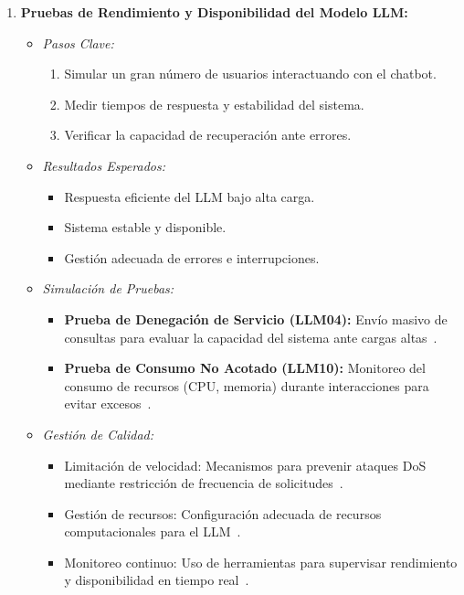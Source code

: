 \documentclass[12pt]{article}
\begin{document}
\begin{enumerate}
    \item \textbf{Pruebas de Rendimiento y Disponibilidad del Modelo LLM:}
        \begin{itemize}
            \item \textit{Pasos Clave:}
                \begin{enumerate}
                    \item Simular un gran número de usuarios interactuando con el chatbot.
                    \item Medir tiempos de respuesta y estabilidad del sistema.
                    \item Verificar la capacidad de recuperación ante errores.
                \end{enumerate}
            \item \textit{Resultados Esperados:}
                \begin{itemize}
                    \item Respuesta eficiente del LLM bajo alta carga.
                    \item Sistema estable y disponible.
                    \item Gestión adecuada de errores e interrupciones.
                \end{itemize}
            \item \textit{Simulación de Pruebas:}
                \begin{itemize}
                    \item \textbf{Prueba de Denegación de Servicio (LLM04):} Envío masivo de consultas para evaluar la capacidad del sistema ante cargas altas~\cite{fortanix}.
                    \item \textbf{Prueba de Consumo No Acotado (LLM10):} Monitoreo del consumo de recursos (CPU, memoria) durante interacciones para evitar excesos~\cite{fortanix}.
                \end{itemize}
            \item \textit{Gestión de Calidad:}
                \begin{itemize}
                    \item Limitación de velocidad: Mecanismos para prevenir ataques DoS mediante restricción de frecuencia de solicitudes~\cite{wiz}.
                    \item Gestión de recursos: Configuración adecuada de recursos computacionales para el LLM~\cite{wiz}.
                    \item Monitoreo continuo: Uso de herramientas para supervisar rendimiento y disponibilidad en tiempo real~\cite{vstorm}.
                \end{itemize}
        \end{itemize}


\end{enumerate}
\end{document}
